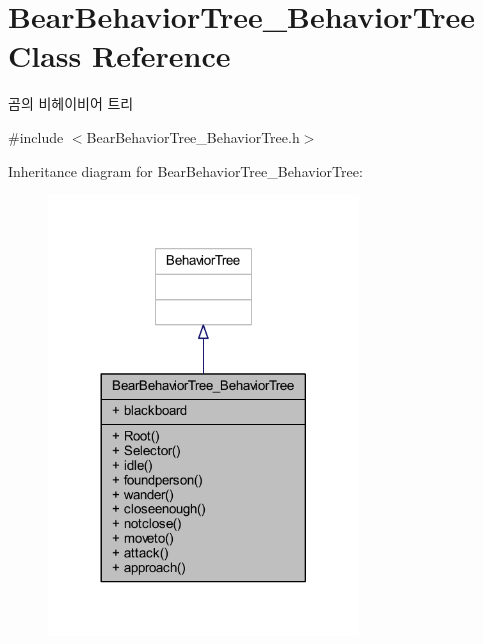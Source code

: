 \hypertarget{class_bear_behavior_tree___behavior_tree}{}\section{Bear\+Behavior\+Tree\+\_\+\+Behavior\+Tree Class Reference}
\label{class_bear_behavior_tree___behavior_tree}


곰의 비헤이비어 트리  




{\ttfamily \#include $<$Bear\+Behavior\+Tree\+\_\+\+Behavior\+Tree.\+h$>$}



Inheritance diagram for Bear\+Behavior\+Tree\+\_\+\+Behavior\+Tree\+:\nopagebreak
\begin{figure}[H]
\begin{center}
\leavevmode
\includegraphics[width=233pt]{class_bear_behavior_tree___behavior_tree__inherit__graph}
\end{center}
\end{figure}


